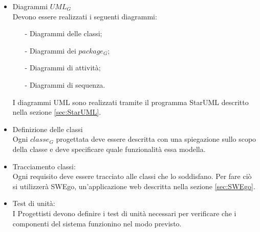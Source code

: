 				\begin{itemize}
					\item Diagrammi $UML_G$\\
					Devono essere realizzati i seguenti diagrammi:
					\begin{itemize}
						\item[-] Diagrammi delle classi;
						\item[-] Diagrammi dei $package_G$;
						\item[-] Diagrammi di attività;
						\item[-] Diagrammi di sequenza.
					\end{itemize}
				I diagrammi UML sono realizzati tramite il programma StarUML descritto nella sezione \ref{sec:StarUML}.
					\item Definizione delle classi\\ 
					Ogni $classe_G$ progettata deve essere descritta con una spiegazione sullo scopo della classe e deve specificare quale funzionalità essa modella. 
					\item Tracciamento classi:\\
					Ogni requisito deve essere tracciato alle classi che lo soddisfano. Per fare ciò si utilizzerà SWEgo, un'applicazione web descritta nella sezione \ref{sec:SWEgo}.
					\item Test di unità:\\
					I Progettisti devono definire i test di unità necessari per verificare che i componenti del sistema funzionino nel modo previsto.
				\end{itemize}
			
			
